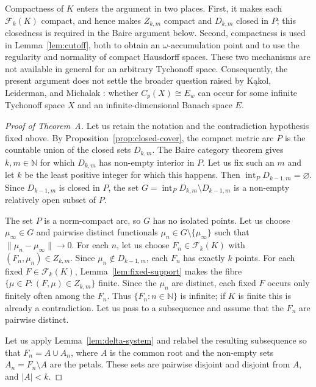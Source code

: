 \documentclass[a4paper]{amsart}
\newcommand{\N}{\mathbb{N}}
\newcommand{\abs}[1]{\lvert #1\rvert}
\newcommand{\norm}[1]{\lVert #1\rVert}
\newcommand{\Fin}{\mathcal F}
\begin{document}
Compactness of $K$ enters the argument in two places.  First, it makes
each $\Fin_k(K)$ compact, and hence makes $Z_{k,m}$ compact and
$D_{k,m}$ closed in $P$; this closedness is required in the Baire
argument below.  Second, compactness is used in
Lemma~\ref{lem:cutoff}, both to obtain an $\omega$-accumulation point and
to use the regularity and normality of compact Hausdorff spaces.  These
two mechanisms are not available in general for an arbitrary Tychonoff space.
Consequently, the present argument does not settle the broader question
raised by K\k{a}kol, Leiderman, and Michalak
\cite{KakolLeidermanMichalak2022}: whether $C_p(X)\cong E_w$ can occur
for some infinite Tychonoff space $X$ and an infinite-dimensional
Banach space $E$.

\begin{proof}[Proof of Theorem~A]
Let us retain the notation and the contradiction hypothesis fixed above.  By
Proposition~\ref{prop:closed-cover}, the compact metric arc $P$ is the countable
union of the closed sets $D_{k,m}$.  The Baire category theorem gives
$k,m\in\N$ for which $D_{k,m}$ has non-empty interior in $P$.  Let us fix
such an $m$ and let $k$ be the least positive integer for which this
happens.  Then $\operatorname{int}_P D_{k-1,m}=\varnothing$.  Since
$D_{k-1,m}$ is closed in $P$, the set
$G=\operatorname{int}_P D_{k,m}\setminus D_{k-1,m}$ is a non-empty
relatively open subset of $P$.

The set $P$ is a norm-compact arc, so $G$ has no isolated points.  Let us choose
$\mu_\infty\in G$ and pairwise distinct functionals
$\mu_n\in G\setminus\{\mu_\infty\}$ such that
$\norm{\mu_n-\mu_\infty}\to0$.
For each $n$, let us choose $F_n\in\Fin_k(K)$ with
$(F_n,\mu_n)\in Z_{k,m}$.
Since $\mu_n\notin D_{k-1,m}$, each $F_n$ has exactly $k$ points.
For each fixed $F\in\Fin_k(K)$, Lemma~\ref{lem:fixed-support} makes the
fibre $\{\mu\in P:(F,\mu)\in Z_{k,m}\}$ finite.  Since the $\mu_n$ are
distinct, each fixed $F$ occurs only finitely often among the $F_n$.
Thus $\{F_n:n\in\N\}$ is infinite; if $K$ is finite this is already a
contradiction.  Let us pass to a subsequence and assume that the $F_n$
are pairwise distinct.

Let us apply Lemma~\ref{lem:delta-system} and relabel the resulting subsequence
so that $F_n=A\cup A_n$, where $A$ is the common root and the non-empty
sets $A_n=F_n\setminus A$ are the petals.  These sets are pairwise disjoint
and disjoint from $A$, and $\abs A<k$.


\end{proof}
\end{document}
